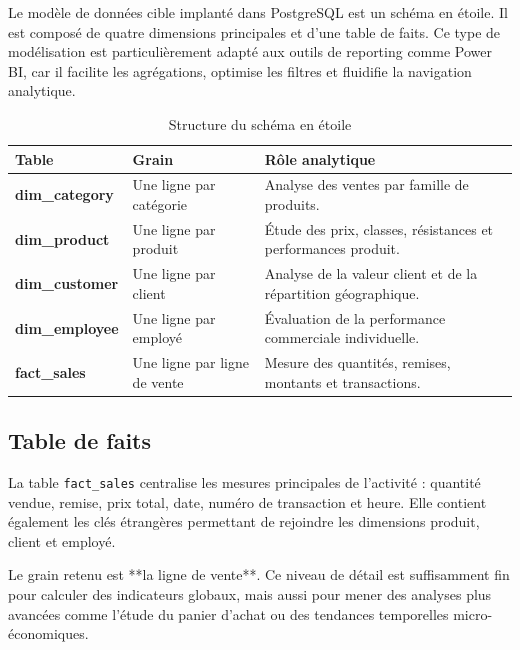 \documentclass[12pt,a4paper,twoside]{report}
\begin{document}
Le modèle de données cible implanté dans PostgreSQL est un schéma en étoile. Il est composé de quatre dimensions principales et d'une table de faits. Ce type de modélisation est particulièrement adapté aux outils de reporting comme Power BI, car il facilite les agrégations, optimise les filtres et fluidifie la navigation analytique.

\begin{table}[H]
\centering
{}
\begin{tabularx}{\textwidth}{>{\bfseries}p{3.2cm}p{3.8cm}X}
\toprule
\rowcolor{TableHeader}
\color{white}Table & \color{white}Grain & \color{white}Rôle analytique \\
\midrule
dim\_category & Une ligne par catégorie & Analyse des ventes par famille de produits. \\
dim\_product & Une ligne par produit & Étude des prix, classes, résistances et performances produit. \\
dim\_customer & Une ligne par client & Analyse de la valeur client et de la répartition géographique. \\
dim\_employee & Une ligne par employé & Évaluation de la performance commerciale individuelle. \\
fact\_sales & Une ligne par ligne de vente & Mesure des quantités, remises, montants et transactions. \\
\bottomrule
\end{tabularx}
\caption{Structure du schéma en étoile}
\label{tab:schema_etoile}
\end{table}

\subsection{Table de faits}
La table \texttt{fact\_sales} centralise les mesures principales de l'activité : quantité vendue, remise, prix total, date, numéro de transaction et heure. Elle contient également les clés étrangères permettant de rejoindre les dimensions produit, client et employé.

Le grain retenu est **la ligne de vente**. Ce niveau de détail est suffisamment fin pour calculer des indicateurs globaux, mais aussi pour mener des analyses plus avancées comme l'étude du panier d'achat ou des tendances temporelles micro-économiques.
\end{document}
